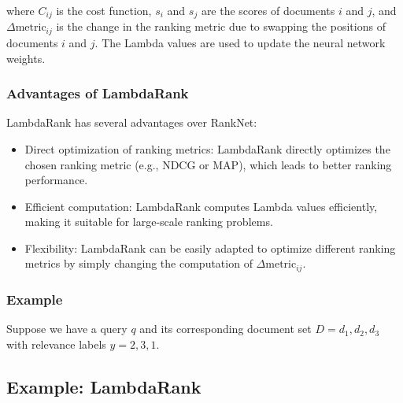 \documentclass[12pt]{article}
\begin{document}
where $C_{ij}$ is the cost function, $s_i$ and $s_j$ are the scores of documents $i$ and $j$, and $\Delta \text{metric}_{ij}$ is the change in the ranking metric due to swapping the positions of documents $i$ and $j$. The Lambda values are used to update the neural network weights.

\subsubsection{Advantages of LambdaRank}

LambdaRank has several advantages over RankNet:

\begin{itemize}
\item Direct optimization of ranking metrics: LambdaRank directly optimizes the chosen ranking metric (e.g., NDCG or MAP), which leads to better ranking performance.
\item Efficient computation: LambdaRank computes Lambda values efficiently, making it suitable for large-scale ranking problems.
\item Flexibility: LambdaRank can be easily adapted to optimize different ranking metrics by simply changing the computation of $\Delta \text{metric}_{ij}$.
\end{itemize}


\subsubsection{Example}

Suppose we have a query $q$ and its corresponding document set $D = {d_1, d_2, d_3}$ with relevance labels $y = {2, 3, 1}$.

\subsection{Example: LambdaRank}
\end{document}
